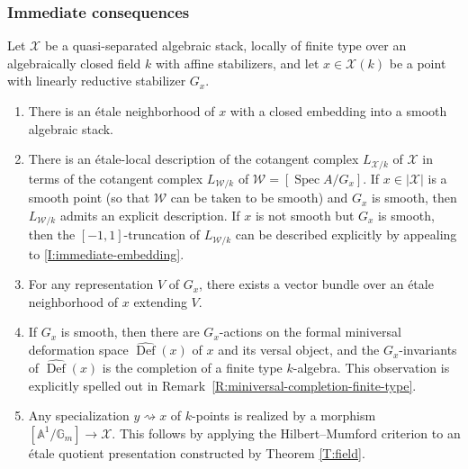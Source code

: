 \documentclass[a4paper]{amsart}
\theoremstyle{plain}
\theoremstyle{definition}
\theoremstyle{remark}
\numberwithin{equation}{section}
\newcommand{\GG}{\mathbb{G}}
\renewcommand\AA{\mathbb{A}}
\newcommand\cW{\mathcal{W}}
\newcommand\cX{\mathcal{X}}
\DeclareMathOperator{\Spec}{Spec}
\renewcommand{\hat}{\widehat}
\newcommand{\itemref}[1]{\eqref{#1}}
\DeclareMathOperator{\Def}{Def}
\begin{document}
\subsubsection*{Immediate consequences}\label{A:immediate}
Let $\cX$ be a quasi-separated algebraic stack, locally of finite type over an algebraically closed field $k$ with affine stabilizers, and let $x \in \cX(k)$ be a point with linearly reductive stabilizer $G_x$.
\begin{enumerate}
\item\label{I:immediate-embedding} There is an \'etale neighborhood of $x$ with a closed embedding into a smooth algebraic stack.
\item There is an \'etale-local description of the cotangent complex $L_{\cX/k}$ of $\cX$ in terms of the cotangent complex $L_{\cW/k}$ of $\cW=[\Spec A/G_x]$.  If $x \in |\cX|$ is a smooth point (so that $\cW$ can be taken to be smooth) and $G_x$ is smooth, then $L_{\cW/k}$ admits an explicit description.  If $x$ is not smooth but $G_x$ is smooth, then the $[-1,1]$-truncation of $L_{\cW/k}$ can be described explicitly by appealing to \itemref{I:immediate-embedding}.
\item For any representation $V$ of $G_x$, there exists a vector bundle over an \'etale neighborhood of $x$ extending $V$.
\item If $G_x$ is smooth, then there are $G_x$-actions on the formal miniversal deformation space $\hat{\Def}(x)$ of $x$ and its versal object, and the $G_x$-invariants of $\hat{\Def}(x)$ is the completion of a finite type $k$-algebra.  This observation is explicitly spelled out in Remark~\ref{R:miniversal-completion-finite-type}.
\item Any specialization $y \rightsquigarrow x$  of $k$-points is realized by a morphism $[\AA^1/\GG_m] \to \cX$. This follows by applying the Hilbert--Mumford criterion to an \'etale quotient presentation constructed by Theorem \ref{T:field}.
\end{enumerate}
\end{document}
